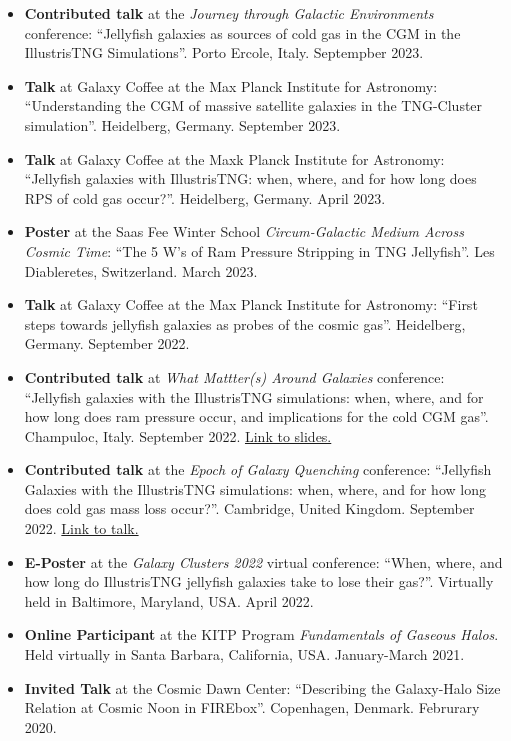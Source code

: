\documentclass[a4paper,10pt,oneside]{article}
\begin{document}
\begin{itemize}[wide, labelwidth=!, labelindent=-11pt, parsep=0pt]
    \item {\bf Contributed talk} at the {\it Journey through Galactic Environments} conference: ``Jellyfish galaxies as sources of cold gas in the CGM in the IllustrisTNG Simulations''. Porto Ercole, Italy. Septempber 2023.
    \item {\bf Talk} at Galaxy Coffee at the Max Planck Institute for Astronomy: ``Understanding the CGM of massive satellite galaxies in the TNG-Cluster simulation''. Heidelberg, Germany. September 2023.
    \item {\bf Talk} at Galaxy Coffee at the Maxk Planck Institute for Astronomy: ``Jellyfish galaxies with IllustrisTNG: when, where, and for how long does RPS of cold gas occur?''. Heidelberg, Germany. April 2023.
    \item {\bf Poster} at the Saas Fee Winter School {\it Circum-Galactic Medium Across Cosmic Time}: ``The 5 W's of Ram Pressure Stripping in TNG Jellyfish''. Les Diableretes, Switzerland. March 2023.
    \item {\bf Talk} at Galaxy Coffee at the Max Planck Institute for Astronomy: ``First steps towards jellyfish galaxies as probes of the cosmic gas''. Heidelberg, Germany. September 2022.
    \item {\bf Contributed talk} at {\it What Mattter(s) Around Galaxies} conference: ``Jellyfish galaxies with the IllustrisTNG simulations: when, where, and for how long does ram pressure occur, and implications for the cold CGM gas''. Champuloc, Italy. September 2022. \href{https://drive.google.com/file/u/0/d/1x4FNVCmUWTFwznOAs9RYhLwkKl-kmhZT/view?usp=drive_web}{Link to slides.}
    \item {\bf Contributed talk} at the {\it Epoch of Galaxy Quenching} conference: ``Jellyfish Galaxies with the IllustrisTNG simulations: when, where, and for how long does cold gas mass loss occur?''. Cambridge, United Kingdom. September 2022. \href{https://sites.google.com/cam.ac.uk/quenching/programme#h.ohkoyw4ilbje}{Link to talk.}
    \item {\bf E-Poster} at the {\it Galaxy Clusters 2022} virtual conference: ``When, where, and how long do IllustrisTNG jellyfish galaxies take to lose their gas?''. Virtually held in Baltimore, Maryland, USA. April 2022.
    \item {\bf Online Participant} at the KITP Program {\it Fundamentals of Gaseous Halos}. Held virtually in Santa Barbara, California, USA. January-March 2021. 
    \item {\bf Invited Talk} at the Cosmic Dawn Center: ``Describing the Galaxy-Halo Size Relation at Cosmic Noon in FIREbox''. Copenhagen, Denmark. Februrary 2020. 

\end{itemize}
\end{document}
